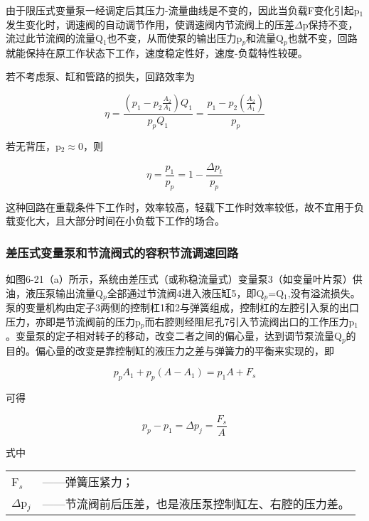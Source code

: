 由于限压式变量泵一经调定后其压力-流量曲线是不变的，因此当负载F变化引起p$_1$发生变化时，调速阀的自动调节作用，使调速阀内节流阀上的压差$\Delta$p保持不变，流过此节流阀的流量Q$_1$也不变，从而使泵的输出压力p$_p$和流量Q$_p$也就不变，回路就能保持在原工作状态下工作，速度稳定性好，速度-负载特性较硬。

若不考虑泵、缸和管路的损失，回路效率为

\begin{equation}
  \eta= \frac{({p_1-{p_2 \frac{A_2}{A_1}}})Q_1}{p_pQ_1}= \frac{p_1-{p_2( \frac{A_2}{A_1})}}{p_p}
\end{equation}

\noindent 若无背压，p$_2$$\approx$0，则

\begin{equation}
  \eta= \frac{p_1}{p_p}=1-\frac{\Delta p_t}{p_p}
\end{equation}

这种回路在重载条件下工作时，效率较高，轻载下工作时效率较低，故不宜用于负载变化大，且大部分时间在小负载下工作的场合。

\subsubsection{差压式变量泵和节流阀式的容积节流调速回路}

如图6-21（a）所示，系统由差压式（或称稳流量式）变量泵3（如变量叶片泵）供油，液压泵输出流量Q$_p$全部通过节流阀4进入液压缸5，即Q$_p$=Q$_1$,没有溢流损失。泵的变量机构由定子3两侧的控制杠1和2与弹簧组成，控制杠的左腔引入泵的出口压力，亦即是节流阀前的压力p$_p$而右腔则经阻尼孔7引入节流阀出口的工作压力p$_1$。变量泵的定子相对转子的移动，改变二者之间的偏心量，达到调节泵流量Q$_p$的目的。偏心量的改变是靠控制缸的液压力之差与弹簧力的平衡来实现的，即

\begin{equation}
  p_pA_1+p_p(A-A_1)=p_1A+F_s
\end{equation}

\noindent 可得

\begin{equation}
 p_p-p_1=\Delta p_j= \frac{F_s}{A}
\end{equation}

\noindent 式中\ 
\begin{tabular} [t]{ll}
F$_s$ &——\hspace{1mm}弹簧压紧力；\\
$\Delta$p$_j$ &——\hspace{1mm}节流阀前后压差，也是液压泵控制缸左、右腔的压力差。
\end{tabular}

